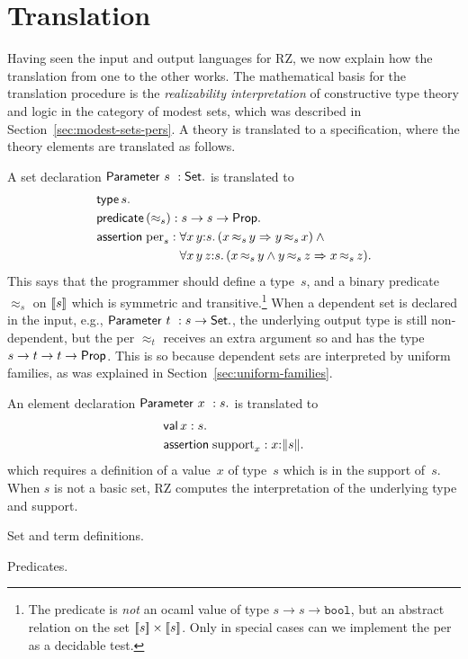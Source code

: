 
\section{Translation}
\label{sec:translation}

Having seen the input and output languages for RZ, we now explain how
the translation from one to the other works. The mathematical basis
for the translation procedure is the \emph{realizability
  interpretation} of constructive type theory and logic in the
category of modest sets, which was described in
Section~\ref{sec:modest-sets-pers}. A theory is translated to a
specification, where the theory elements are translated as follows.

A set declaration $\mathsf{Parameter}\ s\ : \mathsf{Set}.$ is translated to
%
\begin{align*}
  & \otyspec{s}. \\
  & \opropspec{({\approx_{s}})}{\oarrow{s}{\oarrow{s}{\oProp}}}.\\
  & \oassertion{\mathrm{per}_{s}}{
    \begin{aligned}[t]
      & \oforall{x\,y}{s}{(\oimply{\oper{s}{x}{y}}{\oper{s}{y}{x}})}
        \land {} \\
      & \oforall{x\,y\,z}{s}{(
        \oimply{
          \oper{s}{x}{y} \land \oper{s}{y}{z}
          }{\oper{s}{x}{z}}
        )}.
    \end{aligned}
  }
\end{align*}
%
This says that the programmer should define a type~$s$, and a binary
predicate~$\approx_s$ on $[\![s]\!]$ which is symmetric and
transitive.\footnote{The predicate is \emph{not} an ocaml value of
  type $s \to s \to \mathtt{bool}$, but an abstract relation on the
  set $[\![s]\!] \times [\![s]\!]$. Only in special cases can we
  implement the per as a decidable test.} When a dependent set is
declared in the input, e.g., $\mathsf{Parameter}\ t\ : s \to \mathsf{Set}.$, the
underlying output type is still non-dependent, but the per $\approx_t$
receives an extra argument so and has the type
$s \to t \to t \to \mathsf{Prop}$. This is so because
dependent sets are interpreted by uniform families, as was explained
in Section~\ref{sec:uniform-families}.

An element declaration $\mathsf{Parameter}\ x\ : s.$ is translated to
%
\begin{align*}
  & \mathsf{val}\,x:s. \\
  & \mathsf{assertion}\; \mathrm{support}_x : x{:}\|s\|.
\end{align*}
%
which requires a definition of a value~$x$ of type~$s$ which is in the
support of~$s$. When $s$ is not a basic set, RZ computes the
interpretation of the underlying type and support.

Set and term definitions.

Predicates.


